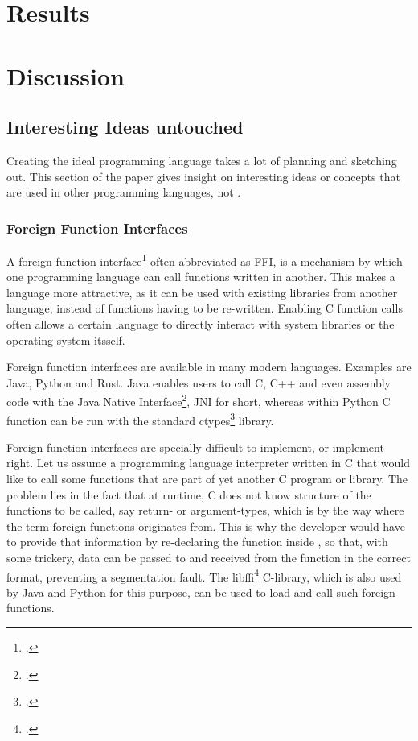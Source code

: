 \documentclass[12pt,a4paper,man]{apa7}
\begin{document}
\section{Results}
\section{Discussion}

\subsection{Interesting Ideas untouched}
Creating the ideal programming language takes a lot of planning and sketching
out. This section of the paper gives insight on interesting ideas or concepts
that are used in other programming languages, not \name.

\subsubsection{Foreign Function Interfaces}
A foreign function interface\footcite{FFI} often abbreviated as FFI,
is a mechanism by which one programming language can call functions written 
in another. This makes a language more attractive, as it can be used with
existing libraries from another language, instead of functions having to be
re-written. Enabling C function calls often allows a certain language to
directly interact with system libraries or the operating system itsself.

Foreign function interfaces are available in many modern languages.
Examples are Java, Python and Rust.
Java enables users to call C, C++ and even assembly code with the Java Native
Interface\footcite{JNI}, JNI for short, whereas within Python C function can
be run with the standard ctypes\footcite{ctypes} library.

Foreign function interfaces are specially difficult to implement, or implement
right. Let us assume a programming language interpreter \name written in C that
would like to call some functions that are part of yet another C program or
library. The problem lies in the fact that at runtime, C does not know
structure of the functions to be called, say return- or argument-types, which
is by the way where the term foreign functions originates from. This is why the
\name developer would have to provide that information by re-declaring the
function inside \name, so that, with some trickery, data can be passed to and
received from the function in the correct format, preventing a segmentation
fault. The libffi\footcite{libffi} C-library, which is also used by Java and
Python for this purpose, can be used to load and call such foreign functions.
\end{document}
